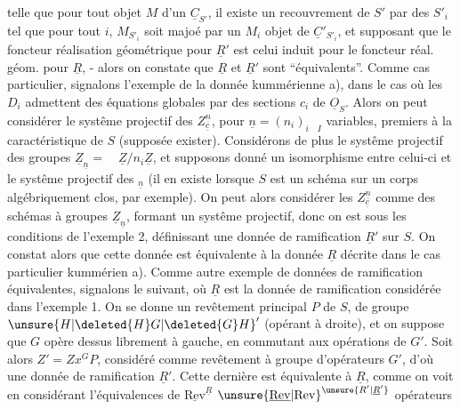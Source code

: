 telle que pour tout objet $M$ d'un $\underline{C}_{S'}$, il existe un recouvrement de $S'$ par des $S'_i$ tel que pour tout $i$, $M_{S'_i}$ soit  majoé par un $M_i$ objet de $\underline{C}'_{S'_i}$,  et supposant que le foncteur réalisation géométrique pour $\underline{R}'$ est celui induit pour le foncteur réal. géom. pour $\underline{R}$, - alors on constate que $\underline{R}$ et $\underline{R}'$ sont ``équivalents''. Comme cas particulier, signalons l'exemple de la donnée kummérienne a), dans le cas où les $D_i$ admettent des équations globales par des sections $c_i$ de $\underline{O}_S$. Alors on peut considérer le systême projectif des $Z_{\underline{c}}^{\underline{n}}$, pour $\underline{n}=(n_i)_{i\quad I}$ variables, premiers  à la caractéristique de $S$ (supposée exister). Considérons de plus le systême projectif des groupes $\underline{Z}_{\underline{n}}=\quad\underline{Z}/n_i\underline{Z}$, et supposons donné un isomorphisme entre celui-ci et le systême projectif des ${}_{\underline{n}}$ (il en existe lorsque $S$ est un schéma sur un corps algébriquement clos, par exemple). On peut alors considérer les $Z_{\underline{c}}^{\underline{n}}$ comme des schémas à groupes $\underline{Z}_{\underline{n}}$, formant un systême projectif,  donc on est sous les conditions de l'exemple 2, définissant une donnée de ramification $\underline{R}'$ sur $S$. On constat alors que cette donnée est équivalente à la donnée $\underline{R}$ décrite dans le cas particulier kummérien a). Comme autre exemple de données de ramification équivalentes, signalons le suivant, où $\underline{R}$ est la donnée de ramification considérée dans l'exemple 1. On se donne un revêtement principal $P$ de $S$, de groupe $\unsure{H|\deleted{H}G|\deleted{G}H}'$ (opérant à droite), et on suppose que $G$ opère dessus librement à gauche, en commutant aux opérations de $G'$. Soit alors $Z'=Zx^{G}P$, considéré comme revêtement à groupe d'opérateurs $G'$, d'où une donnée de ramification $\underline{R}'$. Cette dernière est équivalente à $\underline{R}$, comme on voit en considérant l'équivalences  de   $\underline{\mathrm{Rev}}^{\underline{R}}$  ${\unsure{\underline{\mathrm{Rev}}|\mathrm{Rev}}}^{\unsure{R'|\underline{R}'}}$ opérateurs 
